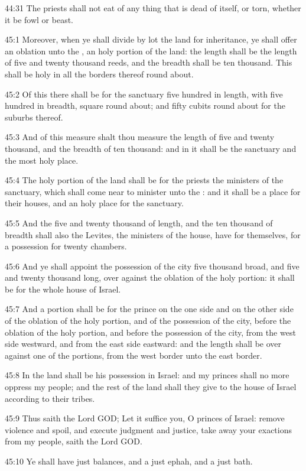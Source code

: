 44:31 The priests shall not eat of any thing that is dead of itself,
or torn, whether it be fowl or beast.

45:1 Moreover, when ye shall divide by lot the land for inheritance,
ye shall offer an oblation unto the \LORD, an holy portion of the land:
the length shall be the length of five and twenty thousand reeds, and
the breadth shall be ten thousand. This shall be holy in all the
borders thereof round about.

45:2 Of this there shall be for the sanctuary five hundred in length,
with five hundred in breadth, square round about; and fifty cubits
round about for the suburbs thereof.

45:3 And of this measure shalt thou measure the length of five and
twenty thousand, and the breadth of ten thousand: and in it shall be
the sanctuary and the most holy place.

45:4 The holy portion of the land shall be for the priests the
ministers of the sanctuary, which shall come near to minister unto the
\LORD: and it shall be a place for their houses, and an holy place for
the sanctuary.

45:5 And the five and twenty thousand of length, and the ten thousand
of breadth shall also the Levites, the ministers of the house, have
for themselves, for a possession for twenty chambers.

45:6 And ye shall appoint the possession of the city five thousand
broad, and five and twenty thousand long, over against the oblation of
the holy portion: it shall be for the whole house of Israel.

45:7 And a portion shall be for the prince on the one side and on the
other side of the oblation of the holy portion, and of the possession
of the city, before the oblation of the holy portion, and before the
possession of the city, from the west side westward, and from the east
side eastward: and the length shall be over against one of the
portions, from the west border unto the east border.

45:8 In the land shall be his possession in Israel: and my princes
shall no more oppress my people; and the rest of the land shall they
give to the house of Israel according to their tribes.

45:9 Thus saith the Lord GOD; Let it suffice you, O princes of Israel:
remove violence and spoil, and execute judgment and justice, take away
your exactions from my people, saith the Lord GOD.

45:10 Ye shall have just balances, and a just ephah, and a just bath.

